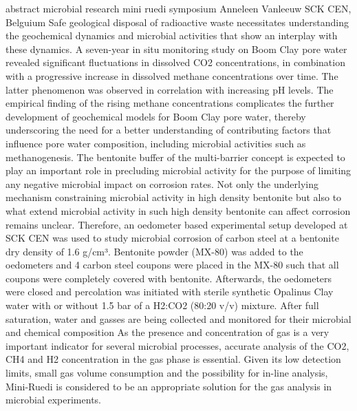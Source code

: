 \begin{conf-abstract}
{abstract microbial research mini ruedi symposium}
{Anneleen Vanleeuw}
{SCK CEN, Belguium}
{Safe geological disposal of radioactive waste necessitates understanding the geochemical dynamics and microbial activities that show an interplay with these dynamics. A seven-year in situ monitoring study on Boom Clay pore water revealed significant fluctuations in dissolved CO2 concentrations, in combination with a progressive increase in dissolved methane concentrations over time. The latter phenomenon was observed in correlation with increasing pH levels. The empirical finding of the rising methane concentrations complicates the further development of geochemical models for Boom Clay pore water, thereby underscoring the need for a better understanding of contributing factors that influence pore water composition, including microbial activities such as methanogenesis. 
The bentonite buffer of the multi-barrier concept is expected to play an important role in precluding microbial activity for the purpose of limiting any negative microbial impact on corrosion rates. Not only the underlying mechanism constraining microbial activity in high density bentonite but also to what extend microbial activity in such high density bentonite can affect corrosion remains unclear. Therefore, an oedometer based experimental setup developed at SCK CEN was used to study microbial corrosion of carbon steel at a bentonite dry density of 1.6 g/cm³. Bentonite powder (MX-80) was added to the oedometers and 4 carbon steel coupons were placed in the MX-80 such that all coupons were completely covered with bentonite. Afterwards, the oedometers were closed and percolation was initiated with sterile synthetic Opalinus Clay water with or without 1.5 bar of a H2:CO2 (80:20 v/v) mixture. After full saturation, water and gasses are being collected and monitored for their microbial and chemical composition 
As the presence and concentration of gas is a very important indicator for several microbial processes, accurate analysis of the CO2, CH4 and H2 concentration in the gas phase is essential. Given its low detection limits, small gas volume consumption and the possibility for in-line analysis, Mini-Ruedi is considered to be an appropriate solution for the gas analysis in microbial experiments.}
\end{conf-abstract}
